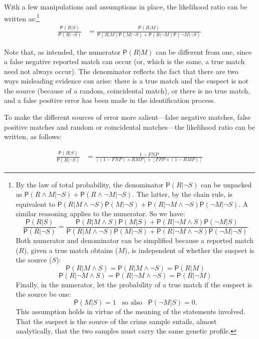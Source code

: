 \documentclass[
  10pt,
  dvipsnames,enabledeprecatedfontcommands]{scrartcl}
\newcommand{\n}{\neg}
\newcommand{\et}{\wedge}
\newcommand{\pr}[1]{\mathsf{P}(#1)}
\begin{document}
\noindent With a few manipulations and assumptions in place, the
likelihood ratio can be written as:\footnote{By the law of total
  probability, the denominator \(\pr{R \vert \neg S}\) can be unpacked
  as \(\pr{R \wedge M \vert \neg S} + \pr{R \wedge \neg M | \neg S}\).
  The latter, by the chain rule, is equivalent to
  \(\pr{R \vert M \wedge \neg S}\pr{ M \vert \n S} + \pr{R \vert \n M \wedge \neg S}\pr{\n M \vert \n S}\).
  A similar reasoning applies to the numerator. So we have:
  \[\frac{\pr{R \vert S}}{\pr{R \vert \neg S}} = \frac{\pr{R \vert M \et S}\pr{M \vert S} + \pr{R \vert \n M \et S}\pr{\n M \vert S}} {\pr{R \vert M \et \n S}\pr{M \vert \n S} + \pr{R \vert \n M \et \n S}\pr{\n M \vert \n S}}
  \] Both numerator and denominator can be simplified because a reported
  match (\(R\)), given a true match obtains (\(M\)), is independent of
  whether the suspect is the source (\(S\)):
  \[\pr{R \vert M \et S} = \pr{R \vert M \et \n S} = \pr{R \vert M}\]
  \[\pr{R \vert \n M \et S} = \pr{R \vert\n M \et \n S} = \pr{R \vert \n M}\]
  Finally, in the numerator, let the probability of a true match if the
  suspect is the source be one:
  \[\pr{M\vert S} = 1  \,\,\, \mbox{ so also } \,\,\, \pr{\n M \vert S}=0.\]
  This assumption holds in virtue of the meaning of the statements
  involved. That the suspect is the source of the crime sample entails,
  almost analytically, that the two samples must carry the same genetic
  profile.} \begin{align}
\label{eq:LRfp4}
\frac{\pr{R \vert S}}{\pr{R \vert \neg S}} & = \frac{
\pr{R \vert M}
}{
\pr{R \vert M }\pr{M \vert \n S} +
\pr{R \vert \n M}\pr{\n M \vert \n S}
}
\end{align}

\noindent Note that, as intended, the numerator \(\pr{R \vert M}\) can
be different from one, since a false negative reported match can occur
(or, which is the same, a true match need not always occur). The
denominator reflects the fact that there are two ways misleading
evidence can arise: there is a true match and the suspect is not the
source (because of a random, coincidental match), or there is no true
match, and a false positive error has been made in the identification
process.

To make the different sources of error more salient---false negative
matches, false positive matches and random or coincidental matches---the
likelihood ratio can be written, as follows:

\begin{align}
\label{eq:LRfp4b}
\frac{\pr{R \vert S}}{\pr{R \vert \neg S}} & = \frac{1-FNP}{[(1-FNP)\times RMP] + [ FPP \times (1-RMP)]}
\end{align}
\end{document}

